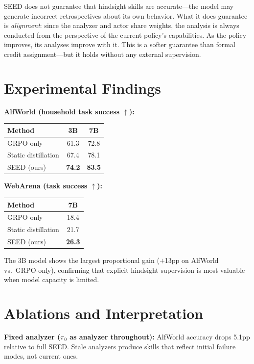 \documentclass[10pt,twocolumn]{article}
\begin{document}
SEED does not guarantee that hindsight skills are accurate---the model
may generate incorrect retrospectives about its own behavior. What
it does guarantee is \emph{alignment}: since the analyzer and actor
share weights, the analysis is always conducted from the perspective
of the current policy's capabilities. As the policy improves, its
analyses improve with it. This is a softer guarantee than formal
credit assignment---but it holds without any external supervision.

\section{Experimental Findings}

\textbf{AlfWorld (household task success $\uparrow$):}

\begin{center}\small
\begin{tabular}{lcc}
\toprule
Method & 3B & 7B \\
\midrule
GRPO only & 61.3 & 72.8 \\
Static distillation & 67.4 & 78.1 \\
SEED (ours) & \textbf{74.2} & \textbf{83.5} \\
\bottomrule
\end{tabular}
\end{center}

\textbf{WebArena (task success $\uparrow$):}

\begin{center}\small
\begin{tabular}{lc}
\toprule
Method & 7B \\
\midrule
GRPO only & 18.4 \\
Static distillation & 21.7 \\
SEED (ours) & \textbf{26.3} \\
\bottomrule
\end{tabular}
\end{center}

The 3B model shows the largest proportional gain ($+$13pp on AlfWorld
vs.\ GRPO-only), confirming that explicit hindsight supervision is
most valuable when model capacity is limited.

\section{Ablations and Interpretation}

\textbf{Fixed analyzer ($\pi_0$ as analyzer throughout):} AlfWorld
accuracy drops 5.1pp relative to full SEED. Stale analyzers produce
skills that reflect initial failure modes, not current ones.
\end{document}
